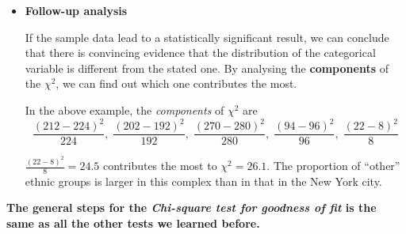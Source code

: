 \documentclass[a4paper, 12pt,twoside]{book}
\begin{document}
\begin{itemize}
\item \textbf{Follow-up analysis}\vspace{0.3cm}

If the sample data lead to a statistically significant result, we can conclude that there is convincing evidence that the distribution of the categorical variable is different from the stated one.  By analysing the \textbf{components} of the $\chi^2$, we can find out which one contributes the most. \vspace{0.3cm}

In the above example, the \textit{components} of $\chi^2$ are
$$\frac{(212-224)^2}{224},\;\frac{(202-192)^2}{192},\;
\frac{(270-280)^2}{280},\;\frac{(94-96)^2}{96},\;\frac{(22-8)^2}{8} $$

$\frac{(22-8)^2}{8} = 24.5$ contributes the most to $\chi^2 = 26.1$. The proportion of ``other'' ethnic groups is larger in this complex than in that in the New York city.
\end{itemize}

\newpage

\textbf{The general steps for the \textit{Chi-square test for goodness of fit} is the same as all the other tests we learned before.}\vspace{0.3cm}
\end{document}
